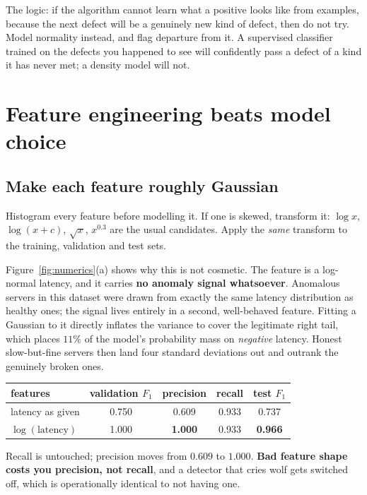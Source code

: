 \documentclass[11pt,a4paper]{article}
\begin{document}
The logic: if the algorithm cannot learn what a positive looks like from
examples, because the next defect will be a genuinely new kind of defect,
then do not try. Model normality instead, and flag departure from it. A
supervised classifier trained on the defects you happened to see will
confidently pass a defect of a kind it has never met; a density model will not.

\section{Feature engineering beats model choice}
\label{sec:features}

\subsection*{Make each feature roughly Gaussian}

Histogram every feature before modelling it. If one is skewed, transform it:
$\log x$, $\log(x+c)$, $\sqrt{x}$, $x^{0.3}$ are the usual candidates. Apply
the \emph{same} transform to the training, validation and test sets.

Figure~\ref{fig:numerics}(a) shows why this is not cosmetic. The feature is a
log-normal latency, and it carries \textbf{no anomaly signal whatsoever}.
Anomalous servers in this dataset were drawn from exactly the same latency
distribution as healthy ones; the signal lives entirely in a second,
well-behaved feature. Fitting a Gaussian to it directly inflates the variance
to cover the legitimate right tail, which places $11\%$ of the model's
probability mass on \emph{negative} latency. Honest slow-but-fine servers then
land four standard deviations out and outrank the genuinely broken ones.

\begin{center}\small
\begin{tabular}{@{}lcccc@{}}
\toprule
features & validation $F_1$ & precision & recall & test $F_1$ \\
\midrule
latency as given & 0.750 & 0.609 & 0.933 & 0.737 \\
$\log(\text{latency})$ & 1.000 & \textbf{1.000} & 0.933 & \textbf{0.966} \\
\bottomrule
\end{tabular}
\end{center}

Recall is untouched; precision moves from $0.609$ to $1.000$. \textbf{Bad
feature shape costs you precision, not recall}, and a detector that cries
wolf gets switched off, which is operationally identical to not having one.
\end{document}
